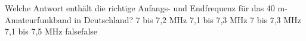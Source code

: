     {Welche Antwort enthält die richtige Anfangs- und Endfrequenz für das 40 m-Amateurfunkband in Deutschland?}
    {7 bis 7,2 MHz}
    {7,1 bis 7,3 MHz}
    {7 bis 7,3 MHz}
    {7,1 bis 7,5 MHz}
    {false}{false}
